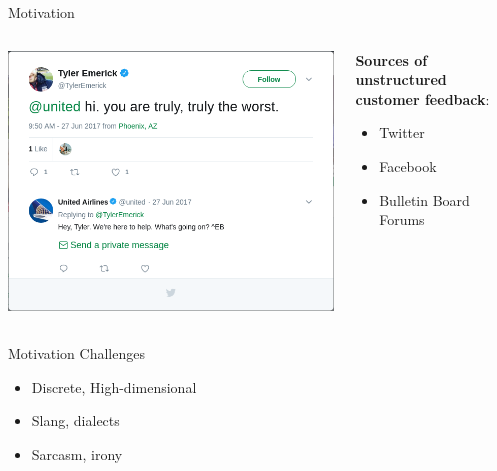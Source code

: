 \documentclass[aspectratio=169]{beamer}
\begin{document}
\begin{frame}{Motivation}

	\begin{columns}[T] %
		\begin{column}{.45\textwidth}
			\includegraphics[width=.9\textwidth]{images/twitter-status.png}
		\end{column}
		\hfill
		\begin{column}{.45\textwidth}
			\textbf{Sources of unstructured customer feedback}:
			\begin{itemize}
				\item Twitter
				\item Facebook
				\item Bulletin Board Forums
			\end{itemize}
		\end{column}
	\end{columns}
\end{frame}

\begin{frame}{Motivation}
	\centering
	{\Huge Challenges} \\
	\vspace{1cm}
	\begin{center}
		\begin{minipage}{0.4\textwidth}
			\begin{itemize}
				\item Discrete, High-dimensional
				\item Slang, dialects
				\item Sarcasm, irony
			\end{itemize}
		\end{minipage}
	\end{center}
\end{frame}
\end{document}
